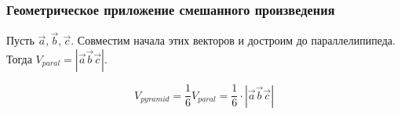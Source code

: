 \subsubsection{Геометрическое приложение смешанного произведения}

Пусть $\vec{a}, \vec{b}, \vec{c}$. Совместим начала этих векторов и достроим до параллелипипеда. Тогда $V_{paral} = |\vec{a} \vec{b} \vec{c}|$.
\begin{note}
  \[
    V_{pyramid} = \frac{1}{6} V_{paral} = \frac{1}{6} \cdot |\vec{a} \vec{b} \vec{c}| 
  \] 
\end{note}

